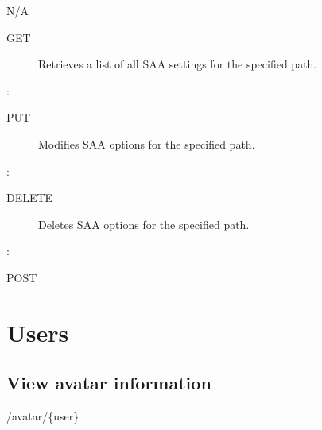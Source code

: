 \documentclass[letterpaper,10pt,english]{sphinxmanual}
\begin{document}
 N/A
\begin{description}
\item[{ GET}] \leavevmode
Retrieves a list of all SAA settings for the specified path.

\end{description}

:

\begin{sphinxVerbatim}[commandchars=\\\{\}]
\end{sphinxVerbatim}
\begin{description}
\item[{ PUT}] \leavevmode
Modifies SAA options for the specified path.

\end{description}

:

\begin{sphinxVerbatim}[commandchars=\\\{\}]
\end{sphinxVerbatim}
\begin{description}
\item[{ DELETE}] \leavevmode
Deletes SAA options for the specified path.

\end{description}

:

\begin{sphinxVerbatim}[commandchars=\\\{\}]
\end{sphinxVerbatim}

 POST


\section{Users}
\label{\detokenize{restapi:users}}

\subsection{View avatar information}
\label{\detokenize{restapi:view-avatar-information}}
 /avatar/\{user\}
\end{document}
